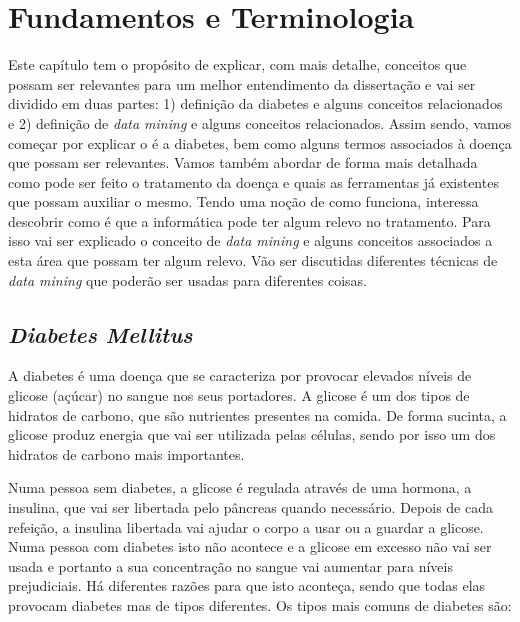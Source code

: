 \chapter{Fundamentos e Terminologia}\label{chap:concepts}

Este capítulo tem o propósito de explicar, com mais detalhe, conceitos que possam ser relevantes para um melhor entendimento da dissertação e vai ser dividido em duas partes: 1) definição da diabetes e alguns conceitos relacionados e 2) definição de \textit{data mining} e alguns conceitos relacionados. 
Assim sendo, vamos começar por explicar o é a diabetes, bem como alguns termos associados à doença que possam ser relevantes. Vamos também abordar de forma mais detalhada como pode ser feito o tratamento da doença e quais as ferramentas já existentes que possam auxiliar o mesmo. 
Tendo uma noção de como funciona, interessa descobrir como é que a informática pode ter algum relevo no tratamento. Para isso vai ser explicado o conceito de \textit{data mining} e alguns conceitos associados a esta área que possam ter algum relevo. Vão ser discutidas diferentes técnicas de \textit{data mining} que poderão ser usadas para diferentes coisas.

\section{\textit{Diabetes Mellitus}}

A diabetes é uma doença que se caracteriza por provocar elevados níveis de glicose (açúcar) no sangue nos seus portadores. A glicose é um dos tipos de hidratos de carbono, que são nutrientes presentes na comida. De forma sucinta, a glicose produz energia que vai ser utilizada pelas células, sendo por isso um dos hidratos de carbono mais importantes. 

Numa pessoa sem diabetes, a glicose é regulada através de uma hormona, a insulina, que vai ser libertada pelo pâncreas quando necessário. Depois de cada refeição, a insulina libertada vai ajudar o corpo a usar ou a guardar a glicose. 
Numa pessoa com diabetes isto não acontece e a glicose em excesso não vai ser usada e portanto a sua concentração no sangue vai aumentar para níveis prejudiciais. Há diferentes razões para que isto aconteça, sendo que todas elas provocam diabetes mas de tipos diferentes. Os tipos mais comuns de diabetes são:

